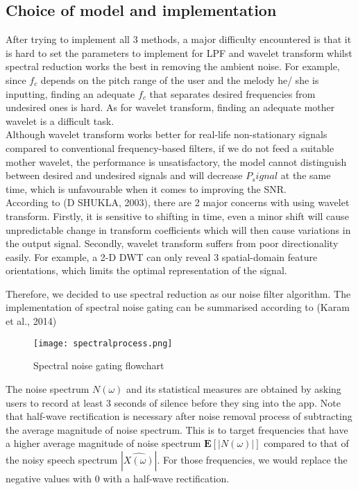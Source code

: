 \subsection{Choice of model and implementation}
After trying to implement all 3 methods, a major difficulty encountered is that it is hard to set the parameters to 
implement for LPF and wavelet transform whilst spectral reduction works the best in removing the ambient noise. 
For example, since $f_c$ depends on the pitch range of the user and the melody he/ she
is inputting, finding an adequate $f_c$ that separates desired frequencies from undesired ones is hard.
As for wavelet transform, finding an adequate mother wavelet is a difficult task.\\
Although wavelet transform works better for real-life non-stationary signals compared to conventional frequency-based filters, if we
do not feed a suitable mother wavelet, the performance is unsatisfactory, the model cannot distinguish between desired and undesired 
signals and will decrease $P_signal$ at the same time, which is unfavourable when it comes to improving the SNR.\\
According to (D SHUKLA, 2003), there are 2 major concerns with using wavelet transform. 
Firstly, it is sensitive to shifting in time, even a minor shift will cause unpredictable change in transform coefficients which will 
then cause variations in the output signal. Secondly, wavelet transform suffers from poor directionality easily. For example, 
a 2-D DWT can only reveal 3 spatial-domain feature orientations, which limits the optimal representation of the signal. 

Therefore, we decided to use spectral reduction as our noise filter algorithm. The implementation of spectral noise gating can be 
summarised according to (Karam et al., 2014)
\begin{figure}
	\centering
	\texttt{[image: spectralprocess.png]}
	\caption{Spectral noise gating flowchart \cite{spectralflowchart}}
	\label{spectralflowchart}
\end{figure}
The noise spectrum $N(\omega)$ and its statistical measures are obtained by asking users to record at least 3 seconds of silence 
before they sing into the app.
Note that half-wave rectification is necessary after noise removal process of subtracting the average magnitude of noise spectrum.
This is to target frequencies that have a higher average magnitude of noise spectrum $\textbf{E}[|N(\omega)|]$ compared to that of 
the noisy speech spectrum $|\hat{X(\omega)}|$. For those frequencies, we would replace the negative values with 0 with a half-wave 
rectification.

